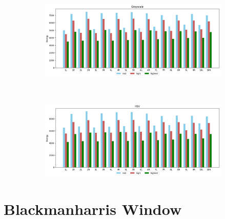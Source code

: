 \begin{figure}[H]
    \caption{Coin "v" STFT approach with Flattop window for Grayscale (a) and HSV (b) colourspaces.}
    \centering
    \begin{subfigure}{\textwidth}
        \centering
        \includegraphics[scale=0.5]{images/appendix/stft/coin_v/flattop_Grayscale.png}
        \caption{}
    \end{subfigure}\\
    \begin{subfigure}{\textwidth}
         \centering
          \includegraphics[scale=0.5]{images/appendix/stft/coin_v/flattop_HSV.png}
          \caption{}
    \end{subfigure}
    \fautor
\end{figure}

\section{Blackmanharris Window}

